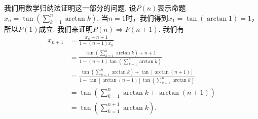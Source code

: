 \begin{solution}
  \begin{inparaenum}[(a)]
    \item 我们用数学归纳法证明这一部分的问题. 设$P(n)$表示命题$x_n=\tan\left(\sum_{k=1}^n\arctan k\right)$. 当$n=1$时，我们得到$x_1=\tan(\arctan1)=1$，所以$P(1)$成立. 我们来证明$P(n)\Rightarrow P(n+1)$. 我们有
        \begin{align*}
          x_{n+1} & = \frac{x_n + n + 1}{1 - (n + 1)x_n} \\
          & = \frac{\tan \left( \sum_{k=1}^n\arctan k \right) + n + 1}
          { 1 - (n + 1)\tan\left( \sum_{k=1}^n\arctan k \right) } \\
          & = \frac{\tan\left( \sum_{k=1}^n\arctan k \right) + \tan[\arctan(n+1)]}
          { 1 - \tan[\arctan(n+1)] \tan\left( \sum_{k=1}^n\arctan k \right)} \\
          & = \tan \left( \sum_{k=1}^n\arctan k + \arctan (n + 1) \right) \\
          & = \tan \left( \sum_{k=1}^{n+1}\arctan k \right).
        \end{align*}


\end{inparaenum}
\end{solution}
